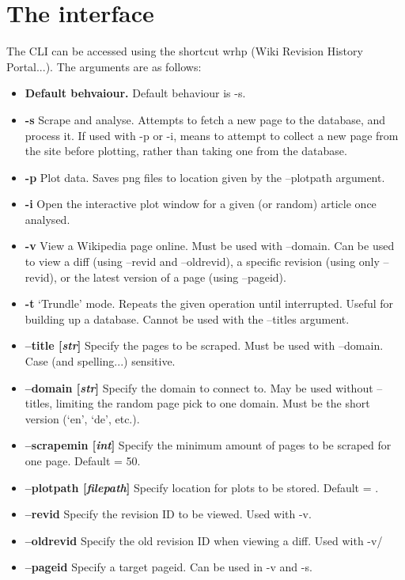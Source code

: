 \section{The interface}
The CLI can be accessed using the shortcut wrhp (Wiki Revision History
Portal...). The arguments are as follows:

\begin{itemize}[label={}]
  \item \textbf{Default behvaiour.} Default behaviour is -s.
  \item \textbf{-s} Scrape and analyse. Attempts to fetch a new page
    to the database, and process it. If used with -p or -i, means to
    attempt to collect a new page from the site before plotting,
    rather than taking one from the database.
  \item \textbf{-p} Plot data. Saves png files to location given by
    the --plotpath argument.
  \item \textbf{-i} Open the interactive plot window for a given (or
    random) article once analysed.
  \item \textbf{-v} View a Wikipedia page online. Must be used with
    --domain. Can be used to view a diff (using --revid and
    --oldrevid), a specific revision (using only --revid), or the
    latest version of a page (using --pageid).
  \item \textbf{-t} `Trundle' mode. Repeats the given operation until
    interrupted. Useful for building up a database. Cannot be used
    with the --titles argument.
  \item \textbf{--title [\textit{str}]} Specify the
    pages to be scraped. Must be used with --domain. Case (and
    spelling...)  sensitive.
  \item \textbf{--domain [\textit{str}]} Specify the domain to connect
    to. May be used without --titles, limiting the random page pick to
    one domain. Must be the short version (`en', `de', etc.).
  \item \textbf{--scrapemin [\textit{int}]} Specify the minimum amount of
    pages to be scraped for one page. Default = 50.
  \item \textbf{--plotpath [\textit{filepath}]} Specify location for
    plots to be stored. Default = .
  \item \textbf{--revid} Specify the revision ID to be viewed. Used
    with -v.
  \item \textbf{--oldrevid} Specify the old revision ID when viewing a
    diff. Used with -v/
  \item \textbf{--pageid} Specify a target pageid. Can be used in -v
    and -s.
\end{itemize}
